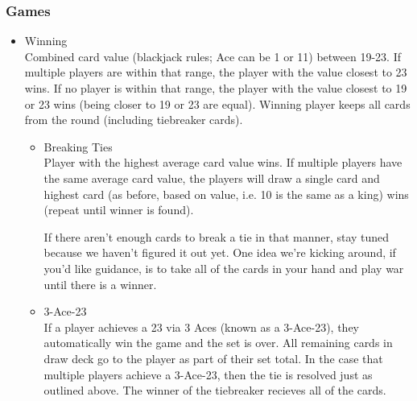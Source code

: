 \documentclass[11pt]{article}
\begin{document}
\subsubsection{Games}
\label{sec-2-2-2}
\begin{itemize}

\item Winning\\
\label{sec-2-2-2-1}%
Combined card value (blackjack rules; Ace can be 1 or 11) between
19-23. If multiple players are within that range, the player with the
value closest to 23 wins. If no player is within that range, the
player with the value closest to 19 or 23 wins (being closer to 19 or
23 are equal). Winning player keeps all cards from the round
(including tiebreaker cards). 

\begin{itemize}

\item Breaking Ties\\
\label{sec-2-2-2-1-1}%
Player with the highest average card value wins. If multiple players
have the same average card value, the players will draw a single card
and highest card (as before, based on value, i.e. 10 is the same as a
king) wins (repeat until winner is found). 

If there aren't enough cards to break a tie in that manner, stay tuned
because we haven't figured it out yet. One idea we're kicking around,
if you'd like guidance, is to take all of the cards in your hand and
play war until there is a winner.


\item 3-Ace-23\\
\label{sec-2-2-2-1-2}%
If a player achieves a 23 via 3 Aces (known as a 3-Ace-23), they
automatically win the game and the set is over. All remaining cards in
draw deck go to the player as part of their set total. In the case that
multiple players achieve a 3-Ace-23, then the tie is resolved just as
outlined above. The winner of the tiebreaker recieves all of the
cards.

\end{itemize} %


\end{itemize}
\end{document}
